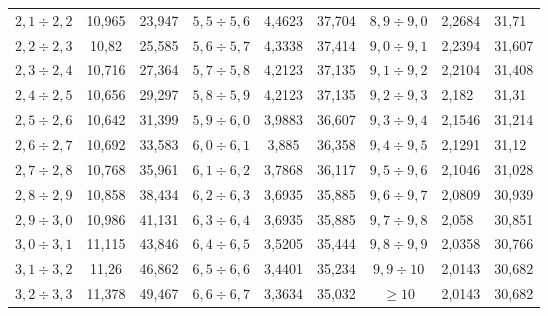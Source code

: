 \begin{table}
\begin{center}
\begin{tabular}{||c|c|c||c|c|c||c|l|l||}
$   2{,}1  \div   2{,}2 $ & 10{,}965  &   23{,}947  & $ 5{,}5  \div   5{,}6 $ & 4{,}4623  &   37{,}704  & $ 8{,}9  \div   9{,}0   $ & 2{,}2684  &   31{,}71   \\
$   2{,}2  \div   2{,}3 $ & 10{,}82\hphantom{9}   &   25{,}585  & $ 5{,}6  \div   5{,}7 $ & 4{,}3338  &   37{,}414  & $ 9{,}0    \div   9{,}1 $ & 2{,}2394  &   31{,}607  \\
$   2{,}3  \div   2{,}4 $ & 10{,}716  &   27{,}364  & $ 5{,}7  \div   5{,}8 $ & 4{,}2123  &   37{,}135  & $ 9{,}1  \div   9{,}2 $ & 2{,}2104  &   31{,}408  \\
$   2{,}4  \div   2{,}5 $ & 10{,}656  &   29{,}297  & $ 5{,}8  \div   5{,}9 $ & 4{,}2123  &   37{,}135  & $ 9{,}2  \div   9{,}3 $ & 2{,}182   &   31{,}31   \\
$   2{,}5  \div   2{,}6 $ & 10{,}642  &   31{,}399  & $ 5{,}9  \div   6{,}0   $ & 3{,}9883  &   36{,}607  & $ 9{,}3  \div   9{,}4 $ & 2{,}1546  &   31{,}214  \\
$   2{,}6  \div   2{,}7 $ & 10{,}692  &   33{,}583  & $ 6{,}0    \div   6{,}1 $ & 3{,}885\hphantom{9}   &   36{,}358  & $ 9{,}4  \div   9{,}5 $ & 2{,}1291  &   31{,}12   \\
$   2{,}7  \div   2{,}8 $ & 10{,}768  &   35{,}961  & $ 6{,}1  \div   6{,}2 $ & 3{,}7868  &   36{,}117  & $ 9{,}5  \div   9{,}6 $ & 2{,}1046  &   31{,}028  \\
$   2{,}8  \div   2{,}9 $ & 10{,}858  &   38{,}434  & $ 6{,}2  \div   6{,}3 $ & 3{,}6935  &   35{,}885  & $ 9{,}6  \div   9{,}7 $ & 2{,}0809  &   30{,}939  \\
$   2{,}9  \div   3{,}0   $ & 10{,}986  &   41{,}131  & $ 6{,}3  \div   6{,}4 $ & 3{,}6935  &   35{,}885  & $ 9{,}7  \div   9{,}8 $ & 2{,}058   &   30{,}851  \\
$   3{,}0  \div   3{,}1 $ & 11{,}115  &   43{,}846  & $ 6{,}4  \div   6{,}5 $ & 3{,}5205  &   35{,}444  & $ 9{,}8  \div   9{,}9 $ & 2{,}0358  &   30{,}766  \\
$   3{,}1  \div   3{,}2 $ & 11{,}26\hphantom{9}   &   46{,}862  & $ 6{,}5  \div   6{,}6 $ & 3{,}4401  &   35{,}234  & $ 9{,}9  \div   10  $ & 2{,}0143  &   30{,}682  \\
$   3{,}2  \div   3{,}3 $ & 11{,}378  &   49{,}467  & $ 6{,}6  \div   6{,}7 $ & 3{,}3634  &   35{,}032  & $      \geqslant   10  $ & 2{,}0143  &   30{,}682  \\
\hline
\end{tabular}
\end{center}
\vspace*{6pt}
\end{table}

